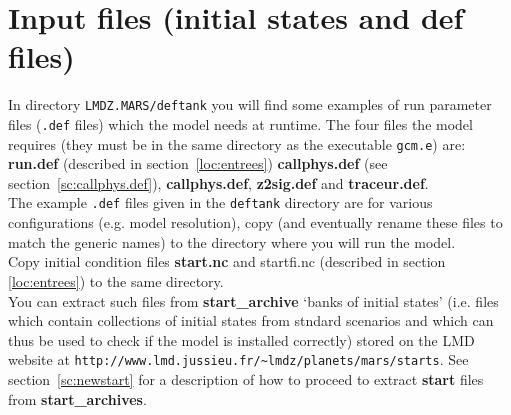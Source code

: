 \section{Input files (initial states and def files)}
\label{sc:inputfiles}
In directory \verb+LMDZ.MARS/deftank+
you will find some examples of run
parameter files ({\tt .def} files) which the model needs at runtime.
The four files the model requires (they must be in the same directory as the
executable {\tt gcm.e}) are:
{\bf run.def} (described in 
section~\ref{loc:entrees}) {\bf callphys.def}
(see section~\ref{sc:callphys.def}), 
{\bf callphys.def}, {\bf z2sig.def} and {\bf traceur.def}.\\

The example {\tt .def} files given in the {\tt deftank} directory
are for various configurations (e.g. model resolution), copy (and eventually
rename these files to match the generic names) to the directory where
you will run the model.\\

Copy initial condition files
{\bf start.nc} and {startfi.nc}  (described in section
\ref{loc:entrees}) to the same directory.\\
You can extract such files from {\bf start\_archive}
`banks of initial states' (i.e. files which
contain collections of initial states from
stndard scenarios and which can thus be used
to check if the model is installed correctly) stored on the LMD website at
\verb+http://www.lmd.jussieu.fr/~lmdz/planets/mars/starts+.
See section~\ref{sc:newstart} for a description of how to proceed to
extract {\bf start} files from {\bf start\_archives}.

